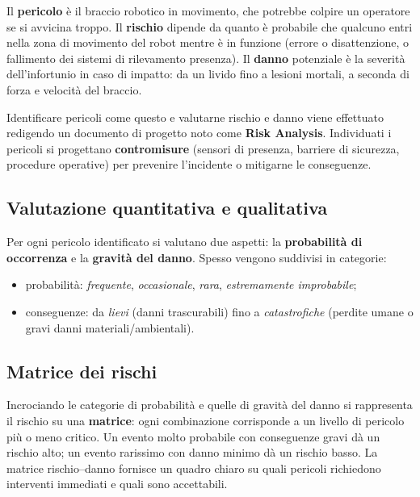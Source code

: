 \begin{ex}
Il \textbf{pericolo} è il braccio robotico in movimento, che potrebbe colpire un operatore se si avvicina troppo. Il \textbf{rischio} dipende da quanto è probabile che qualcuno entri nella zona di movimento del robot mentre è in funzione (errore o disattenzione, o fallimento dei sistemi di rilevamento presenza). Il \textbf{danno} potenziale è la severità dell'infortunio in caso di impatto: da un livido fino a lesioni mortali, a seconda di forza e velocità del braccio.

Identificare pericoli come questo e valutarne rischio e danno viene effettuato redigendo un documento di progetto noto come \textbf{Risk Analysis}. Individuati i pericoli si progettano \textbf{contromisure} (sensori di presenza, barriere di sicurezza, procedure operative) per prevenire l'incidente o mitigarne le conseguenze.
\end{ex}

\subsection{Valutazione quantitativa e qualitativa}
Per ogni pericolo identificato si valutano due aspetti: la \textbf{probabilità di occorrenza} e la \textbf{gravità del danno}. Spesso vengono suddivisi in categorie:
\begin{itemize}
    \item probabilità: \emph{frequente}, \emph{occasionale}, \emph{rara}, \emph{estremamente improbabile};
    \item conseguenze: da \emph{lievi} (danni trascurabili) fino a \emph{catastrofiche} (perdite umane o gravi danni materiali/ambientali).
\end{itemize}

\subsection{Matrice dei rischi}
Incrociando le categorie di probabilità e quelle di gravità del danno si rappresenta il rischio su una \textbf{matrice}: ogni combinazione corrisponde a un livello di pericolo più o meno critico. Un evento molto probabile con conseguenze gravi dà un rischio alto; un evento rarissimo con danno minimo dà un rischio basso. La matrice rischio--danno fornisce un quadro chiaro su quali pericoli richiedono interventi immediati e quali sono accettabili.

